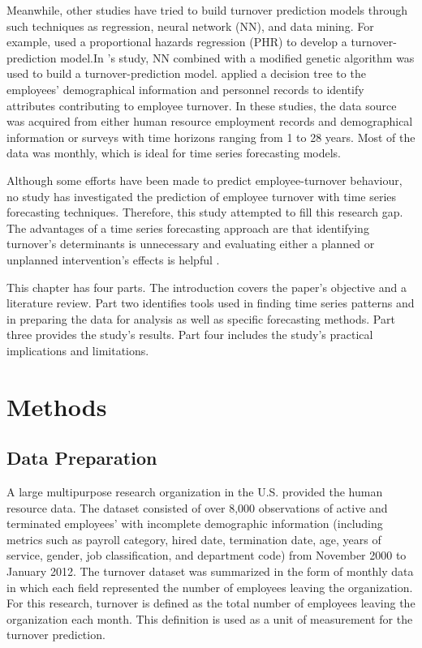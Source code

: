Meanwhile, other studies have tried to build turnover prediction models through such techniques as regression, neural network (NN), and data mining. For example, \citet{ng1991} used a proportional hazards regression (PHR) to develop a turnover-prediction model.In \citet{sexton2005}'s study, NN combined with a modified genetic algorithm was used to build a turnover-prediction model. \citet{alao2013} applied a decision tree to the employees' demographical information and personnel records to identify attributes contributing to employee turnover. In these studies, the data source was acquired from either human resource employment records and demographical information or surveys with time horizons ranging from 1 to 28 years. Most of the data was monthly, which is ideal for time series forecasting models.

Although some efforts have been made to predict employee-turnover behaviour, no study has investigated the prediction of employee turnover with time series forecasting techniques. Therefore, this study attempted to fill this research gap. The advantages of a time series forecasting approach are that identifying turnover's determinants is unnecessary and evaluating either a planned or unplanned intervention's effects is helpful  \citep{velicer2003}.  

This chapter  has four parts. The introduction covers the paper's objective and a literature review. Part two identifies tools used in finding time series patterns and in preparing the data for analysis as well as specific forecasting methods. Part three provides the study's results. Part four includes the study's practical implications and limitations.   
\section{Methods}
\subsection{Data Preparation}
 A large multipurpose research organization in the U.S. provided the human resource data. The dataset consisted of over 8,000 observations of active and terminated employees' with incomplete demographic information (including metrics such as payroll category, hired date, termination date, age, years of service, gender, job classification, and department code) from November 2000 to January 2012. The turnover dataset was summarized in the form of monthly data in which each field represented the number of employees leaving the organization. For this research, turnover is defined as the total  number of employees leaving the organization each month. This definition is used as a unit of measurement for the turnover prediction. 


